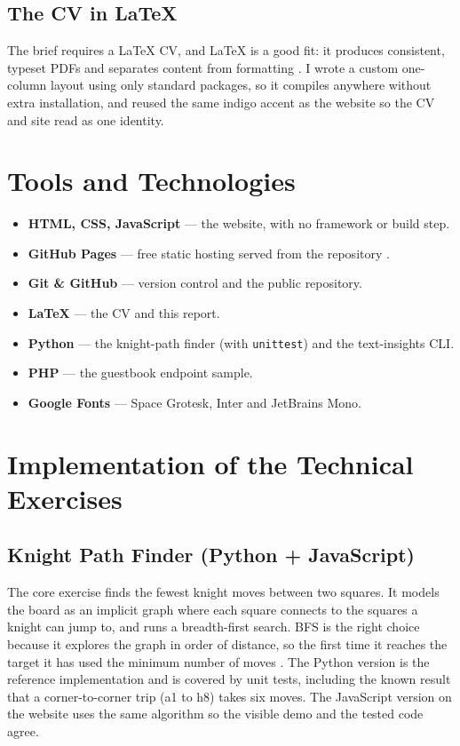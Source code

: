 \documentclass[11pt,a4paper]{article}
\begin{document}
\subsection{The CV in LaTeX}
The brief requires a LaTeX CV, and LaTeX is a good fit: it produces consistent,
typeset PDFs and separates content from formatting \citep{lamport1994}. I wrote a
custom one-column layout using only standard packages, so it compiles anywhere without
extra installation, and reused the same indigo accent as the website so the CV and site
read as one identity.

\section{Tools and Technologies}
\begin{itemize}[leftmargin=1.3em, itemsep=2pt]
  \item \textbf{HTML, CSS, JavaScript} --- the website, with no framework or build step.
  \item \textbf{GitHub Pages} --- free static hosting served from the repository \citep{githubpages2024}.
  \item \textbf{Git \& GitHub} --- version control and the public repository.
  \item \textbf{LaTeX} --- the CV and this report.
  \item \textbf{Python} --- the knight-path finder (with \texttt{unittest}) and the text-insights CLI.
  \item \textbf{PHP} --- the guestbook endpoint sample.
  \item \textbf{Google Fonts} --- Space Grotesk, Inter and JetBrains Mono.
\end{itemize}

\section{Implementation of the Technical Exercises}

\subsection{Knight Path Finder (Python + JavaScript)}
The core exercise finds the fewest knight moves between two squares. It models the board
as an implicit graph where each square connects to the squares a knight can jump to, and
runs a breadth-first search. BFS is the right choice because it explores the graph in
order of distance, so the first time it reaches the target it has used the minimum number
of moves \citep{cormen2009}. The Python version is the reference implementation and is
covered by unit tests, including the known result that a corner-to-corner trip (a1 to h8)
takes six moves. The JavaScript version on the website uses the same algorithm so the
visible demo and the tested code agree.
\end{document}
